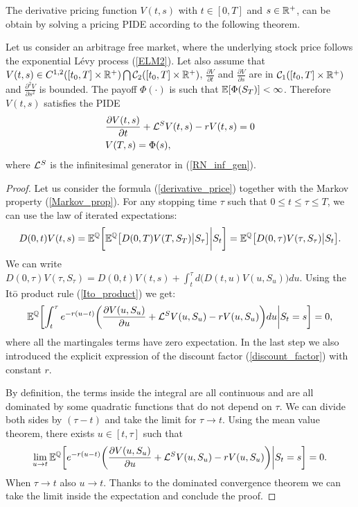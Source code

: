 The derivative pricing function $V(t,s)$ with $t \in [0,T]$ and $s\in \mathbb{R}^+$, can be obtain by solving a pricing PIDE according to the following theorem.
\begin{Theorem}
 Let us consider an arbitrage free market, where the underlying stock price follows the exponential Lévy process (\ref{ELM2}). 
 Let also assume that $V(t,s) \in C^{1,2}([t_0,T] \times \mathbb{R}^+) \bigcap \mathcal{C}_2([t_0,T] \times \mathbb{R}^+)$,
 $\frac{\partial V}{\partial t}$ and $\frac{\partial V}{\partial s}$ are in $\mathcal{C}_1([t_0,T] \times \mathbb{R}^+)$
 and $\frac{\partial^2 V}{\partial s^2}$ is bounded.
 The payoff $\Phi(\cdot)$ is such that $\mathbb{E}[\Phi(S_T)]< \infty$. 
 Therefore $V(t,s)$ satisfies the PIDE
\begin{align}\label{derivative_PIDE}
 & \frac{\partial V(t,s)}{\partial t} + \mathcal{L}^{S} V(t,s) -r V(t,s) = 0 \\
 & V(T,s) = \Phi(s),
\end{align}
where $\mathcal{L}^S$ is the infinitesimal generator in (\ref{RN_inf_gen}). 
\end{Theorem}
\begin{proof}
 Let us consider the formula 
 (\ref{derivative_price}) together with the Markov property (\ref{Markov_prop}). 
 For any stopping time $\tau$ such that $0 \leq t \leq \tau \leq T$, we can use the law of iterated expectations:
 \begin{equation*}
   D(0,t) V(t,s) = \mathbb{E}^{\mathbb{Q}}  \biggl[ \mathbb{E}^{\mathbb{Q}} \bigl[ D(0,T) V(T,S_T) \big| S_{\tau} \bigr] \bigg| S_t \biggr] = \mathbb{E}^{\mathbb{Q}} \bigl[ D(0,\tau) V(\tau,S_{\tau}) \big| S_t \bigr]. 
 \end{equation*}
 We can write $D(0,\tau) V(\tau,S_{\tau}) = D(0,t) V(t,s) + \int_t^{\tau} d\bigl(D(t,u) V(u,S_u)\bigr) du$. 
 Using the It\=o product rule (\ref{Ito_product}) we get:
 $$ \mathbb{E}^{\mathbb{Q}} \biggl[ \int_t^{\tau} e^{-r(u-t)} \biggl( \frac{\partial V(u,S_u)}{\partial u} + \mathcal{L}^{S} V(u,S_u) -r V(u,S_u) \biggr) du \bigg| S_t=s \biggr] = 0, $$
 where all the martingales terms have zero expectation. 
 In the last step we also introduced the explicit expression of the discount factor (\ref{discount_factor}) with constant $r$.
 
 By definition, the terms inside the integral are all continuous and are all dominated by some quadratic functions that do not depend on $\tau$.
 We can divide both sides by $(\tau-t)$ and take the limit for $\tau \to t$. Using the mean value theorem, there exists $u \in [t,\tau]$ such that 
 $$ \lim_{u \to t} \mathbb{E}^{\mathbb{Q}} \biggl[ e^{-r(u-t)} \biggl( \frac{\partial V(u,S_u)}{\partial u} + \mathcal{L}^{S} V(u,S_u) -r V(u,S_u) \biggr) \bigg| S_t=s \biggr] = 0. $$
 When $\tau\to t$ also $u\to t$. Thanks to the dominated convergence theorem we can take the limit inside the expectation and conclude the proof.
\end{proof}
